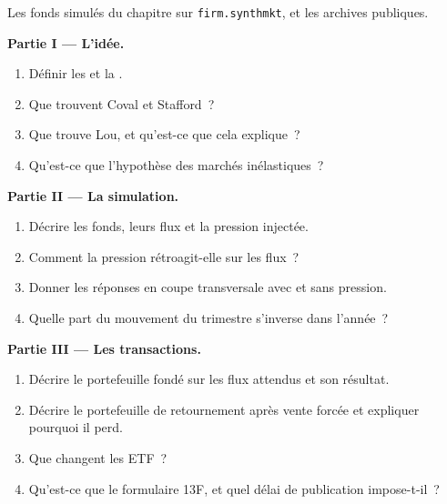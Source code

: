 \begin{problem}\label{pb:s1:flows:1}
Les fonds simulés du chapitre sur \texttt{firm.synthmkt}, et les archives publiques.

\medskip\noindent\textbf{Partie I --- L'idée.}
\begin{enumerate}
\item Définir les  et la .
\item Que trouvent Coval et Stafford~?
\item Que trouve Lou, et qu'est-ce que cela explique~?
\item Qu'est-ce que l'hypothèse des marchés inélastiques~?
\end{enumerate}

\medskip\noindent\textbf{Partie II --- La simulation.}
\begin{enumerate}[resume]
\item Décrire les fonds, leurs flux et la pression injectée.
\item Comment la pression rétroagit-elle sur les flux~?
\item Donner les réponses en coupe transversale avec et sans pression.
\item Quelle part du mouvement du trimestre s'inverse dans l'année~?
\end{enumerate}

\medskip\noindent\textbf{Partie III --- Les transactions.}
\begin{enumerate}[resume]
\item Décrire le portefeuille fondé sur les flux attendus et son résultat.
\item Décrire le portefeuille de retournement après vente forcée et expliquer pourquoi il perd.
\item Que changent les ETF~?
\item Qu'est-ce que le formulaire 13F, et quel délai de publication impose-t-il~?
\end{enumerate}


\end{problem}
